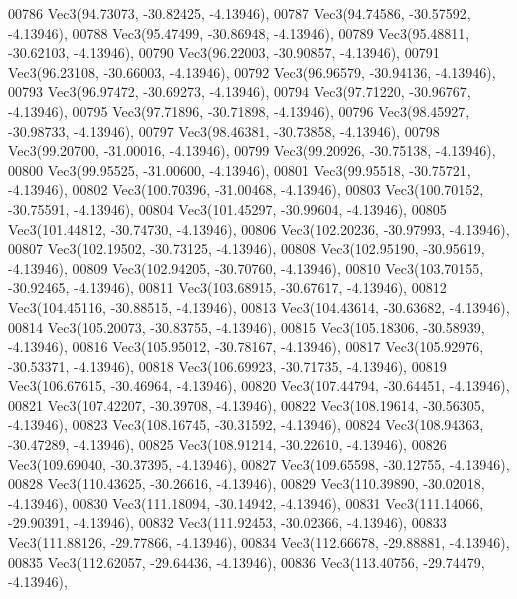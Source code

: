 \begin{DoxyCode}
00786         Vec3(94.73073, -30.82425, -4.13946),
00787         Vec3(94.74586, -30.57592, -4.13946),
00788         Vec3(95.47499, -30.86948, -4.13946),
00789         Vec3(95.48811, -30.62103, -4.13946),
00790         Vec3(96.22003, -30.90857, -4.13946),
00791         Vec3(96.23108, -30.66003, -4.13946),
00792         Vec3(96.96579, -30.94136, -4.13946),
00793         Vec3(96.97472, -30.69273, -4.13946),
00794         Vec3(97.71220, -30.96767, -4.13946),
00795         Vec3(97.71896, -30.71898, -4.13946),
00796         Vec3(98.45927, -30.98733, -4.13946),
00797         Vec3(98.46381, -30.73858, -4.13946),
00798         Vec3(99.20700, -31.00016, -4.13946),
00799         Vec3(99.20926, -30.75138, -4.13946),
00800         Vec3(99.95525, -31.00600, -4.13946),
00801         Vec3(99.95518, -30.75721, -4.13946),
00802         Vec3(100.70396, -31.00468, -4.13946),
00803         Vec3(100.70152, -30.75591, -4.13946),
00804         Vec3(101.45297, -30.99604, -4.13946),
00805         Vec3(101.44812, -30.74730, -4.13946),
00806         Vec3(102.20236, -30.97993, -4.13946),
00807         Vec3(102.19502, -30.73125, -4.13946),
00808         Vec3(102.95190, -30.95619, -4.13946),
00809         Vec3(102.94205, -30.70760, -4.13946),
00810         Vec3(103.70155, -30.92465, -4.13946),
00811         Vec3(103.68915, -30.67617, -4.13946),
00812         Vec3(104.45116, -30.88515, -4.13946),
00813         Vec3(104.43614, -30.63682, -4.13946),
00814         Vec3(105.20073, -30.83755, -4.13946),
00815         Vec3(105.18306, -30.58939, -4.13946),
00816         Vec3(105.95012, -30.78167, -4.13946),
00817         Vec3(105.92976, -30.53371, -4.13946),
00818         Vec3(106.69923, -30.71735, -4.13946),
00819         Vec3(106.67615, -30.46964, -4.13946),
00820         Vec3(107.44794, -30.64451, -4.13946),
00821         Vec3(107.42207, -30.39708, -4.13946),
00822         Vec3(108.19614, -30.56305, -4.13946),
00823         Vec3(108.16745, -30.31592, -4.13946),
00824         Vec3(108.94363, -30.47289, -4.13946),
00825         Vec3(108.91214, -30.22610, -4.13946),
00826         Vec3(109.69040, -30.37395, -4.13946),
00827         Vec3(109.65598, -30.12755, -4.13946),
00828         Vec3(110.43625, -30.26616, -4.13946),
00829         Vec3(110.39890, -30.02018, -4.13946),
00830         Vec3(111.18094, -30.14942, -4.13946),
00831         Vec3(111.14066, -29.90391, -4.13946),
00832         Vec3(111.92453, -30.02366, -4.13946),
00833         Vec3(111.88126, -29.77866, -4.13946),
00834         Vec3(112.66678, -29.88881, -4.13946),
00835         Vec3(112.62057, -29.64436, -4.13946),
00836         Vec3(113.40756, -29.74479, -4.13946),

\end{DoxyCode}
